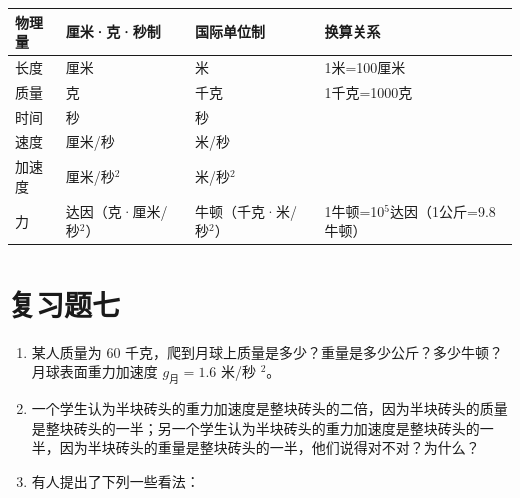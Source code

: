 {\def\LTcaptype{none} %
\begin{longtable}[]{@{}
  >{\raggedright\arraybackslash}p{}
  >{\raggedright\arraybackslash}p{}
  >{\raggedright\arraybackslash}p{}
  >{\raggedright\arraybackslash}p{}@{}}
\toprule\noalign{}
\begin{minipage}[b]{\linewidth}\raggedright
物理量
\end{minipage} & \begin{minipage}[b]{\linewidth}\raggedright
厘米·克·秒制
\end{minipage} & \begin{minipage}[b]{\linewidth}\raggedright
国际单位制
\end{minipage} & \begin{minipage}[b]{\linewidth}\raggedright
换算关系
\end{minipage} \\
\midrule\noalign{}
\endhead
\bottomrule\noalign{}
\endlastfoot
长度 & 厘米 & 米 & 1米=100厘米 \\
质量 & 克 & 千克 & 1千克=1000克 \\
时间 & 秒 & 秒 & \\
速度 & 厘米/秒 & 米/秒 & \\
加速度 & 厘米/秒\(^{2}\) & 米/秒\(^{2}\) & \\
力 & 达因（克·厘米/秒\(^{2}\)） & 牛顿（千克·米/秒\(^{2}\)） &
1牛顿=10\(^{5}\)达因（1公斤=9.8牛顿） \\
\end{longtable}
}

\section{复习题七}\label{ux590dux4e60ux9898ux4e03}

\begin{enumerate}
\def\labelenumi{\arabic{enumi}.}
\item
  某人质量为 60
  千克，爬到月球上质量是多少？重量是多少公斤？多少牛顿？月球表面重力加速度
  \(g_{\text{月}}=1.6\) 米/秒 \(^{2}\)。
\item
  一个学生认为半块砖头的重力加速度是整块砖头的二倍，因为半块砖头的质量是整块砖头的一半；另一个学生认为半块砖头的重力加速度是整块砖头的一半，因为半块砖头的重量是整块砖头的一半，他们说得对不对？为什么？
\item
  有人提出了下列一些看法：
\end{enumerate}

